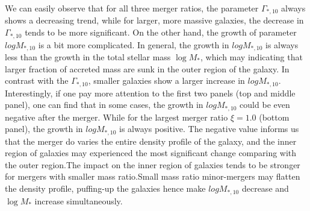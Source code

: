 \documentclass[fleqn,usenatbib]{mnras}
\begin{document}
\par We can easily observe that for all three merger ratios, the parameter $\Gamma_{*,10}$ always shows a decreasing trend, while for larger, more massive galaxies, the decrease in $\Gamma_{*,10}$ tends to be more significant. On the other hand, the growth of parameter $log M_{*,10}$ is a bit more complicated. In general, the growth in $log M_{*,10}$ is always less than the growth in the total stellar mass $\log M_*$, which may indicating that larger fraction of accreted mass are sunk in the outer region of the galaxy. In contrast with the $\Gamma_{*,10}$, smaller galaxies show a larger increase in $log M_{*,10}$. Interestingly, if one pay more attention to the first two panels (top and middle panel), one can find that in some cases, the growth in $log M_{*,10}$ could be even negative after the merger. While for the largest merger ratio $\xi = 1.0$ (bottom panel), the growth in $log M_{*,10}$ is always positive. The negative value informs us that the merger do varies the entire density profile of the galaxy, and the inner region of galaxies may experienced the most significant change comparing with the outer region.The impact on the inner region of galaxies tends to be stronger for mergers with smaller mass ratio.Small mass ratio minor-mergers may flatten the density profile, puffing-up the galaxies hence make $log M_{*,10}$ decrease and $\log M_*$ increase simultaneously.
\end{document}
